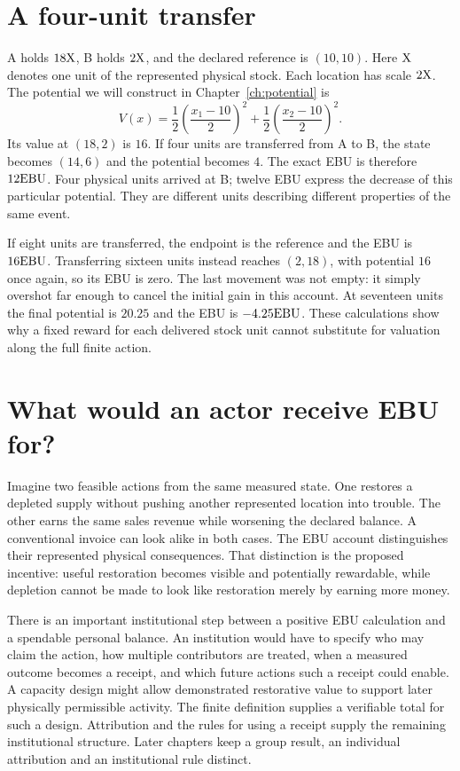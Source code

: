 \section{A four-unit transfer}
A holds $18\mathrm{X}$, B holds $2\mathrm{X}$, and the declared reference is $(10,10)$. Here $\mathrm{X}$ denotes one unit of the represented physical stock. Each location has scale $2\mathrm{X}$. The potential we will construct in Chapter~\ref{ch:potential} is
\begin{equation}
 V(x)=\frac12\left(\frac{x_1-10}{2}\right)^2+
      \frac12\left(\frac{x_2-10}{2}\right)^2 .
\end{equation}
Its value at $(18,2)$ is $16$. If four units are transferred from A to B, the state becomes $(14,6)$ and the potential becomes $4$. The exact EBU is therefore $12\mathrm{EBU}$. Four physical units arrived at B; twelve EBU express the decrease of this particular potential. They are different units describing different properties of the same event.

If eight units are transferred, the endpoint is the reference and the EBU is $16\mathrm{EBU}$. Transferring sixteen units instead reaches $(2,18)$, with potential $16$ once again, so its EBU is zero. The last movement was not empty: it simply overshot far enough to cancel the initial gain in this account. At seventeen units the final potential is $20.25$ and the EBU is $-4.25\mathrm{EBU}$. These calculations show why a fixed reward for each delivered stock unit cannot substitute for valuation along the full finite action.


\section{What would an actor receive EBU for?}
Imagine two feasible actions from the same measured state. One restores a depleted supply without pushing another represented location into trouble. The other earns the same sales revenue while worsening the declared balance. A conventional invoice can look alike in both cases. The EBU account distinguishes their represented physical consequences. That distinction is the proposed incentive: useful restoration becomes visible and potentially rewardable, while depletion cannot be made to look like restoration merely by earning more money.

There is an important institutional step between a positive EBU calculation and a spendable personal balance. An institution would have to specify who may claim the action, how multiple contributors are treated, when a measured outcome becomes a receipt, and which future actions such a receipt could enable. A capacity design might allow demonstrated restorative value to support later physically permissible activity. The finite definition supplies a verifiable total for such a design. Attribution and the rules for using a receipt supply the remaining institutional structure. Later chapters keep a group result, an individual attribution and an institutional rule distinct.

